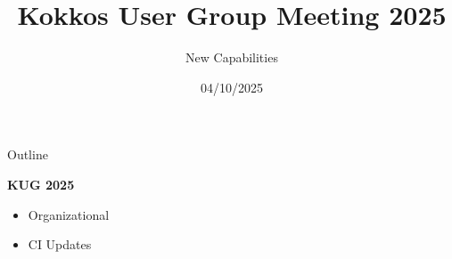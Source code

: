 
\usepackage{tikz}
\graphicspath{{4_6/figures/}}
\usepackage{multicol}
\usepackage{pgfplots}

\def\ornlid{THIS WILL NEED TO BE UPDATED AFTER RESOLUTION}

\title{Kokkos User Group Meeting 2025}

\author{New Capabilities}

\date{04/10/2025}





\begin{frame}
  \titlepage
\end{frame}


\begin{frame}[fragile]{Outline}

  \textbf{KUG 2025}

  \begin{itemize}
    \item{Organizational}
    \item{CI Updates}
  \end{itemize}

\end{frame}







